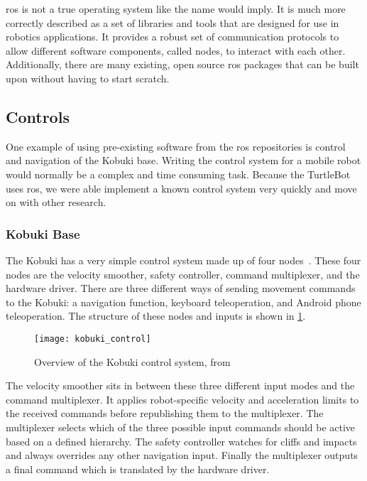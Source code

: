 \documentclass[thesis.tex]{subfile}
\begin{document}
\gls{ros} is not a true operating system like the name would imply. It is much more correctly described as a set of libraries and tools that are designed for use in robotics applications. It provides a robust set of communication protocols to allow different software components, called \glspl{node}, to interact with each other. Additionally, there are many existing, open source \gls{ros} packages that can be built upon without having to start scratch.

\subsection{Controls} \label{sec:controls}
One example of using pre-existing software from the \gls{ros} repositories is control and navigation of the Kobuki base. Writing the control system for a mobile robot would normally be a complex and time consuming task. Because the TurtleBot uses \gls{ros}, we were able implement a known control system very quickly and move on with other research.

\subsubsection{Kobuki Base}
The Kobuki has a very simple control system made up of four \glspl{node}~\cite{KobukiControl}. These four \glspl{node} are the velocity smoother, safety controller, command multiplexer, and the hardware driver. There are three different ways of sending movement commands to the Kobuki: a navigation function, keyboard teleoperation, and Android phone teleoperation. The structure of these nodes and inputs is shown in \cref{fig:kobuki_control}.

\begin{figure}[htbp]
\texttt{[image: kobuki\_control]}
\caption[Overview of the Kobuki control system]{Overview of the Kobuki control system, from~\cite{KobukiControl}}
\label{fig:kobuki_control}
\end{figure}

The velocity smoother sits in between these three different input modes and the command multiplexer. It applies robot-specific velocity and acceleration limits to the received commands before republishing them to the multiplexer. The multiplexer selects which of the three possible input commands should be active based on a defined hierarchy. The safety controller watches for cliffs and impacts and always overrides any other navigation input. Finally the multiplexer outputs a final command which is translated by the hardware driver.
 
\end{document}
